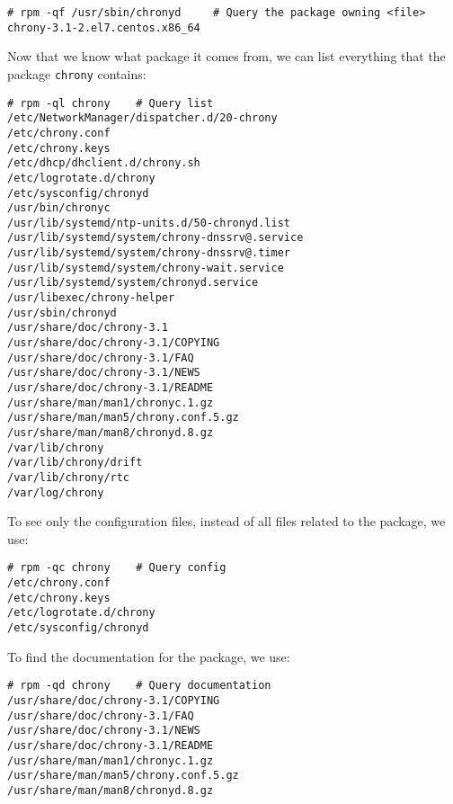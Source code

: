 \vspace{-15pt}
\begin{verbatim}
# rpm -qf /usr/sbin/chronyd 	# Query the package owning <file>
chrony-3.1-2.el7.centos.x86_64
\end{verbatim}
\vspace{-10pt}

\noindent
Now that we know what package it comes from, we can list everything that the package \verb|chrony| contains:

\vspace{-15pt}
\begin{verbatim}
# rpm -ql chrony	# Query list
/etc/NetworkManager/dispatcher.d/20-chrony
/etc/chrony.conf
/etc/chrony.keys
/etc/dhcp/dhclient.d/chrony.sh
/etc/logrotate.d/chrony
/etc/sysconfig/chronyd
/usr/bin/chronyc
/usr/lib/systemd/ntp-units.d/50-chronyd.list
/usr/lib/systemd/system/chrony-dnssrv@.service
/usr/lib/systemd/system/chrony-dnssrv@.timer
/usr/lib/systemd/system/chrony-wait.service
/usr/lib/systemd/system/chronyd.service
/usr/libexec/chrony-helper
/usr/sbin/chronyd
/usr/share/doc/chrony-3.1
/usr/share/doc/chrony-3.1/COPYING
/usr/share/doc/chrony-3.1/FAQ
/usr/share/doc/chrony-3.1/NEWS
/usr/share/doc/chrony-3.1/README
/usr/share/man/man1/chronyc.1.gz
/usr/share/man/man5/chrony.conf.5.gz
/usr/share/man/man8/chronyd.8.gz
/var/lib/chrony
/var/lib/chrony/drift
/var/lib/chrony/rtc
/var/log/chrony
\end{verbatim}
\vspace{-10pt}

\noindent
To see only the configuration files, instead of all files related to the package, we use:

\vspace{-15pt}
\begin{verbatim}
# rpm -qc chrony	# Query config
/etc/chrony.conf
/etc/chrony.keys
/etc/logrotate.d/chrony
/etc/sysconfig/chronyd
\end{verbatim}
\vspace{-10pt}

\noindent
To find the documentation for the package, we use:

\vspace{-15pt}
\begin{verbatim}
# rpm -qd chrony	# Query documentation
/usr/share/doc/chrony-3.1/COPYING
/usr/share/doc/chrony-3.1/FAQ
/usr/share/doc/chrony-3.1/NEWS
/usr/share/doc/chrony-3.1/README
/usr/share/man/man1/chronyc.1.gz
/usr/share/man/man5/chrony.conf.5.gz
/usr/share/man/man8/chronyd.8.gz
\end{verbatim}
\vspace{-10pt}

